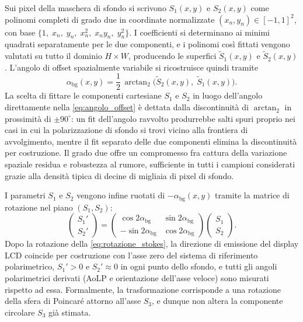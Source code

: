Sui pixel della maschera di sfondo si scrivono $S_1(x, y)$ e $S_2(x, y)$ come polinomi completi di grado due in coordinate normalizzate $(x_n, y_n) \in [-1, 1]^2$, con base $\{1,\; x_n,\; y_n,\; x_n^2,\; x_n y_n,\; y_n^2\}$. I coefficienti si determinano ai minimi quadrati separatamente per le due componenti, e i polinomi così fittati vengono valutati su tutto il dominio $H \times W$, producendo le superfici $\tilde{S}_1(x, y)$ e $\tilde{S}_2(x, y)$. L'angolo di offset spazialmente variabile si ricostruisce quindi tramite
\begin{equation}
    \alpha_{\mathrm{bg}}(x, y) = \frac{1}{2}\,\arctan_2\!\bigl(\tilde{S}_2(x, y),\; \tilde{S}_1(x, y)\bigr).
    \label{eq:angolo_offset}
\end{equation}
La scelta di fittare le componenti cartesiane $S_1$ e $S_2$ in luogo dell'angolo direttamente nella \cref{eq:angolo_offset} è dettata dalla discontinuità di $\arctan_2$ in prossimità di $\pm 90^\circ$: un fit dell'angolo ravvolto produrrebbe salti spuri proprio nei casi in cui la polarizzazione di sfondo si trovi vicino alla frontiera di avvolgimento, mentre il fit separato delle due componenti elimina la discontinuità per costruzione. Il grado due offre un compromesso fra cattura della variazione spaziale residua e robustezza al rumore, sufficiente in tutti i campioni considerati grazie alla densità tipica di decine di migliaia di pixel di sfondo.

I parametri $S_1$ e $S_2$ vengono infine ruotati di $-\alpha_{\mathrm{bg}}(x, y)$ tramite la matrice di rotazione nel piano $(S_1, S_2)$:
\begin{equation}
    \begin{pmatrix} S_1' \\ S_2' \end{pmatrix} = \begin{pmatrix} \cos 2\alpha_{\mathrm{bg}} & \sin 2\alpha_{\mathrm{bg}} \\ -\sin 2\alpha_{\mathrm{bg}} & \cos 2\alpha_{\mathrm{bg}} \end{pmatrix} \begin{pmatrix} S_1 \\ S_2 \end{pmatrix}.
    \label{eq:rotazione_stokes}
\end{equation}
Dopo la rotazione della \cref{eq:rotazione_stokes}, la direzione di emissione del display LCD coincide per costruzione con l'asse zero del sistema di riferimento polarimetrico, $S_1' > 0$ e $S_2' \approx 0$ in ogni punto dello sfondo, e tutti gli angoli polarimetrici derivati (AoLP e orientazione dell'asse veloce) sono misurati rispetto ad essa. Formalmente, la trasformazione corrisponde a una rotazione della sfera di Poincaré attorno all'asse $S_3$, e dunque non altera la componente circolare $S_3$ già stimata.

